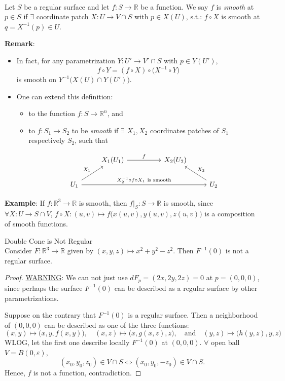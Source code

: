\\
Let $S$ be a regular surface and let $f: S\to\mathbb{R}$ be a function. We say $f$ is \textit{smooth} at $p\in S$ if $\exists$ coordinate patch $X: U\to V\cap S$ with $p\in X(U)$, s.t.: $f\circ X$ is smooth at $q = X^{-1}(p)\in U$.

\noindent\textbf{Remark}:
\begin{itemize}
\item In fact, for any parametrization $Y: U'\to V'\cap S$ with $p\in Y(U')$,
\[
f\circ Y = (f\circ X)\circ\big(X^{-1}\circ Y\big)
\]
is smooth on $Y^{-1}\big(X(U)\cap Y(U')\big)$.
\item One can extend this definition:
\begin{itemize}
\item to the function $f: S\to\mathbb{R}^n$, and
\item to $f: S_1\to S_2$ to be \textit{smooth} if $\exists$ $X_1, X_2$ coordinates patches of $S_1$ respectively $S_2$, such that

\[
\begin{tikzcd}
& X_1(U_1) \ar[rr, "f"] & & X_2(U_2) \\
U_1 \ar[ur, "X_1"] \ar[rrrr, "X_2^{-1}\circ f\circ X_1\ \text{is smooth}"] & & & & U_2 \ar[lu, "X_2"']
\end{tikzcd}
\]

\end{itemize}
\end{itemize}

\noindent\textbf{Example}: If $f: \mathbb{R}^3\to\mathbb{R}$ is smooth, then $f|_S: S\to\mathbb{R}$ is smooth, since $\forall X: U\to S\cap V$, $f\circ X: (u,v)\mapsto f\big(x(u,v), y(u,v), z(u,v)\big)$ is a composition of smooth functions.

\begin{proposition}{Double Cone is Not Regular}\\
Consider $F: \mathbb{R}^3\to\mathbb{R}$ given by $(x, y, z)\mapsto x^2 + y^2 - z^2$. Then $F^{-1}(0)$ is not a regular surface.
\end{proposition}

\begin{proof}
\underline{WARNING}: We can not just use $dF_p = (2x, 2y, 2z) = 0$ at $p = (0, 0, 0)$, since perhaps the surface $F^{-1}(0)$ can be described as a regular surface by other parametrizations.

\noindent Suppose on the contrary that $F^{-1}(0)$ is a regular surface. Then a neighborhood of $(0, 0, 0)$ can be described as one of the three functions:
\[
(x, y)\mapsto\big(x, y, f(x, y)\big), \quad (x, z)\mapsto\big(x, g(x, z), z\big), \quad\text{and}\quad (y, z)\mapsto\big(h(y, z), y, z\big)
\]
WLOG, let the first one describe locally $F^{-1}(0)$ at $(0, 0, 0)$. $\forall$ open ball $V = B(0, \varepsilon)$,
\[
(x_0, y_0, z_0)\in V\cap S \iff (x_0, y_0, -z_0)\in V\cap S.
\]
Hence, $f$ is not a function, contradiction. 
\end{proof}


